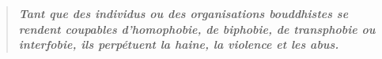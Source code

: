 \documentclass[12pt,openany]{book}
\begin{document}
\newpage
\thispagestyle{empty}

\rmfamily

\begin{center}\end{center}
\begin{center}

\vfill
\color{gray}

\vfill

\end{center}

\begin{figure}[h]
    \centering
\end{figure}

\thispagestyle{empty}

\begin{figure}[h]
\end{figure}

\thispagestyle{empty}

\mainmatter
\newpage
\thispagestyle{empty}
\color{darkgray}
\begingroup
\addtolength\leftmargin{-0.1in}
\begin{quote}
\doublespacing
\centering
\textit{\Large \textbf{Tant que des individus ou des organisations bouddhistes se rendent coupables d'homophobie, de biphobie, de transphobie ou interfobie, ils perpétuent la haine, la violence et les abus.}}
\end{quote}
\end{document}
